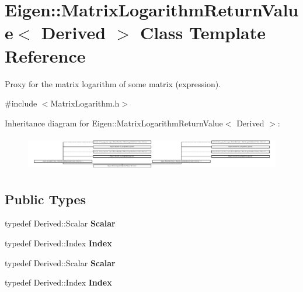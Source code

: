 \hypertarget{class_eigen_1_1_matrix_logarithm_return_value}{}\section{Eigen\+:\+:Matrix\+Logarithm\+Return\+Value$<$ Derived $>$ Class Template Reference}
\label{class_eigen_1_1_matrix_logarithm_return_value}


Proxy for the matrix logarithm of some matrix (expression).  




{\ttfamily \#include $<$Matrix\+Logarithm.\+h$>$}

Inheritance diagram for Eigen\+:\+:Matrix\+Logarithm\+Return\+Value$<$ Derived $>$\+:\begin{figure}[H]
\begin{center}
\leavevmode
\includegraphics[height=1.518987cm]{class_eigen_1_1_matrix_logarithm_return_value}
\end{center}
\end{figure}
\subsection*{Public Types}
\begin{DoxyCompactItemize}
\item 
\mbox{\label{class_eigen_1_1_matrix_logarithm_return_value_ad79436b8ca8b20765dcd9ef6b6c832ad}} 
typedef Derived\+::\+Scalar {\bfseries Scalar}
\item 
\mbox{\label{class_eigen_1_1_matrix_logarithm_return_value_a736377749656a2d0f664cfb36805f521}} 
typedef Derived\+::\+Index {\bfseries Index}
\item 
\mbox{\label{class_eigen_1_1_matrix_logarithm_return_value_ad79436b8ca8b20765dcd9ef6b6c832ad}} 
typedef Derived\+::\+Scalar {\bfseries Scalar}
\item 
\mbox{\label{class_eigen_1_1_matrix_logarithm_return_value_a736377749656a2d0f664cfb36805f521}} 
typedef Derived\+::\+Index {\bfseries Index}
\end{DoxyCompactItemize}

